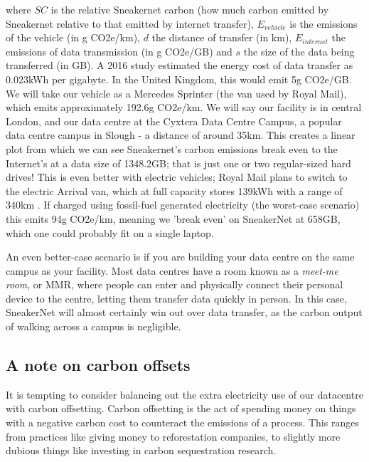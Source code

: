 \documentclass{article}
\begin{document}
where $SC$ is the relative Sneakernet carbon (how much carbon emitted by Sneakernet relative to that emitted by internet transfer), $E_{vehicle}$ is the emissions of the vehicle (in g CO2e/km), $d$ the distance of transfer (in km), $E_{internet}$ the emissions of data transmission (in g CO2e/GB) and $s$ the size of the data being transferred (in GB). A 2016 study estimated the energy cost of data transfer as 0.023kWh per gigabyte. \citep{aslan2018electricity} In the United Kingdom, this would emit 5g CO2e/GB. We will take our vehicle as a Mercedes Sprinter (the van used by Royal Mail), which emits approximately 192.6g CO2e/km. \citep{mercedes2019sprinter} We will say our facility is in central London, and our data centre at the Cyxtera Data Centre Campus, a popular data centre campus in Slough - a distance of around 35km. This creates a linear plot from which we can see Sneakernet's carbon emissions break even to the Internet's at a data size of 1348.2GB; that is just one or two regular-sized hard drives! This is even better with electric vehicles; Royal Mail plans to switch to the electric Arrival van, which at full capacity stores 139kWh with a range of 340km \citep{hubbard2021new}. If charged using fossil-fuel generated electricity (the worst-case scenario) this emits 94g CO2e/km, meaning we 'break even' on SneakerNet at 658GB, which one could probably fit on a single laptop. \newline

An even better-case scenario is if you are building your data centre on the same campus as your facility. Most data centres have a room known as a \emph{meet-me room}, or MMR, where people can enter and physically connect their personal device to the centre, letting them transfer data quickly in person. In this case, SneakerNet will almost certainly win out over data transfer, as the carbon output of walking across a campus is negligible. \newline


\subsection{A note on carbon offsets}
It is tempting to consider balancing out the extra electricity use of our datacentre with carbon offsetting. Carbon offsetting is the act of spending money on things with a negative carbon cost to counteract the emissions of a process. This ranges from practices like giving money to reforestation companies, to slightly more dubious things like investing in carbon sequestration research. \newline
\end{document}
